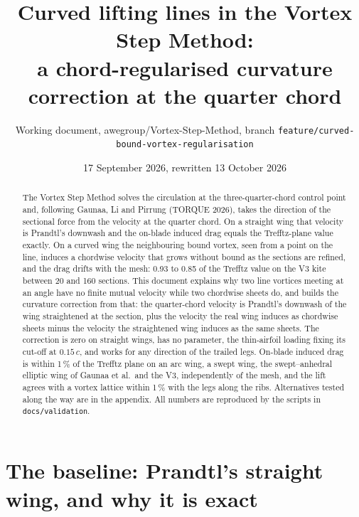 \documentclass[11pt,a4paper]{article}
\title{Curved lifting lines in the Vortex Step Method:\\ a chord-regularised curvature correction at the quarter chord}
\author{Working document, awegroup/Vortex-Step-Method, branch \texttt{feature/curved-bound-vortex-regularisation}}
\date{17 September 2026, rewritten 13 October 2026}
\begin{document}
\maketitle

\begin{abstract}
The Vortex Step Method solves the circulation at the three-quarter-chord control point and, following Gaunaa, Li and Pirrung (TORQUE 2026), takes the direction of the sectional force from the velocity at the quarter chord. On a straight wing that velocity is Prandtl's downwash and the on-blade induced drag equals the Trefftz-plane value exactly. On a curved wing the neighbouring bound vortex, seen from a point on the line, induces a chordwise velocity that grows without bound as the sections are refined, and the drag drifts with the mesh: 0.93 to 0.85 of the Trefftz value on the V3 kite between 20 and 160 sections. This document explains why two line vortices meeting at an angle have no finite mutual velocity while two chordwise sheets do, and builds the curvature correction from that: the quarter-chord velocity is Prandtl's downwash of the wing straightened at the section, plus the velocity the real wing induces as chordwise sheets minus the velocity the straightened wing induces as the same sheets. The correction is zero on straight wings, has no parameter, the thin-airfoil loading fixing its cut-off at $0.15\,c$, and works for any direction of the trailed legs. On-blade induced drag is within 1\,\% of the Trefftz plane on an arc wing, a swept wing, the swept--anhedral elliptic wing of Gaunaa et al.\ and the V3, independently of the mesh, and the lift agrees with a vortex lattice within 1\,\% with the legs along the ribs. Alternatives tested along the way are in the appendix. All numbers are reproduced by the scripts in \texttt{docs/validation}.
\end{abstract}

\section{The baseline: Prandtl's straight wing, and why it is exact}
\label{sec:baseline}
\end{document}
